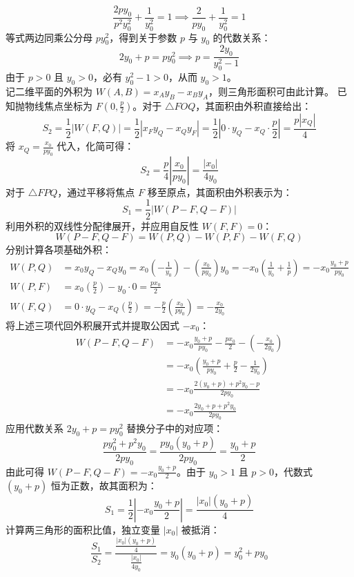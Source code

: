 \begin{solution}
\[ \frac{2p y_0}{p^2 y_0^2} + \frac{1}{y_0^2} = 1 \implies \frac{2}{p y_0} + \frac{1}{y_0^2} = 1 \]
等式两边同乘公分母 $p y_0^2$，得到关于参数 $p$ 与 $y_0$ 的代数关系：
\[ 2y_0 + p = p y_0^2 \implies p = \frac{2y_0}{y_0^2 - 1} \]
由于 $p > 0$ 且 $y_0 > 0$，必有 $y_0^2 - 1 > 0$，从而 $y_0 > 1$。\\
记二维平面的外积为 $W(A, B) = x_A y_B - x_B y_A$，则三角形面积可由此计算。
已知抛物线焦点坐标为 $F\left(0, \frac{p}{2}\right)$。对于 $\triangle FOQ$，其面积由外积直接给出：
\[ S_2 = \frac{1}{2} \big| W(F, Q) \big| = \frac{1}{2} \left| x_F y_Q - x_Q y_F \right| = \frac{1}{2} \left| 0 \cdot y_Q - x_Q \cdot \frac{p}{2} \right| = \frac{p |x_Q|}{4} \]
将 $x_Q = \frac{x_0}{p y_0}$ 代入，化简可得：
\[ S_2 = \frac{p}{4} \left| \frac{x_0}{p y_0} \right| = \frac{|x_0|}{4y_0} \]
对于 $\triangle FPQ$，通过平移将焦点 $F$ 移至原点，其面积由外积表示为：
\[ S_1 = \frac{1}{2} \big| W(P-F, Q-F) \big| \]
利用外积的双线性分配律展开，并应用自反性 $W(F, F) = 0$：
\[ W(P-F, Q-F) = W(P, Q) - W(P, F) - W(F, Q) \]
分别计算各项基础外积：
\begin{align*}
W(P, Q) &= x_0 y_Q - x_Q y_0 = x_0 \left(-\frac{1}{y_0}\right) - \left(\frac{x_0}{p y_0}\right) y_0 = -x_0 \left( \frac{1}{y_0} + \frac{1}{p} \right) = -x_0 \frac{y_0 + p}{p y_0} \\
W(P, F) &= x_0 \left(\frac{p}{2}\right) - y_0 \cdot 0 = \frac{p x_0}{2} \\
W(F, Q) &= 0 \cdot y_Q - x_Q \left(\frac{p}{2}\right) = -\frac{p}{2} \left(\frac{x_0}{p y_0}\right) = -\frac{x_0}{2y_0}
\end{align*}
将上述三项代回外积展开式并提取公因式 $-x_0$：
\begin{align*}
W(P-F, Q-F) &= -x_0 \frac{y_0 + p}{p y_0} - \frac{p x_0}{2} - \left(-\frac{x_0}{2y_0}\right) \\
&= -x_0 \left( \frac{y_0 + p}{p y_0} + \frac{p}{2} - \frac{1}{2y_0} \right) \\
&= -x_0 \frac{2(y_0 + p) + p^2 y_0 - p}{2p y_0} \\
&= -x_0 \frac{2y_0 + p + p^2 y_0}{2p y_0}
\end{align*}
应用代数关系 $2y_0 + p = p y_0^2$ 替换分子中的对应项：
\[ \frac{p y_0^2 + p^2 y_0}{2p y_0} = \frac{p y_0 (y_0 + p)}{2p y_0} = \frac{y_0 + p}{2} \]
由此可得 $W(P-F, Q-F) = -x_0 \frac{y_0 + p}{2}$。由于 $y_0 > 1$ 且 $p > 0$，代数式 $(y_0 + p)$ 恒为正数，故其面积为：
\[ S_1 = \frac{1}{2} \left| -x_0 \frac{y_0 + p}{2} \right| = \frac{|x_0|(y_0 + p)}{4} \]
计算两三角形的面积比值，独立变量 $|x_0|$ 被抵消：
\[ \frac{S_1}{S_2} = \frac{ \frac{|x_0|(y_0 + p)}{4} }{ \frac{|x_0|}{4y_0} } = y_0(y_0 + p) = y_0^2 + p y_0 \]

\end{solution}
